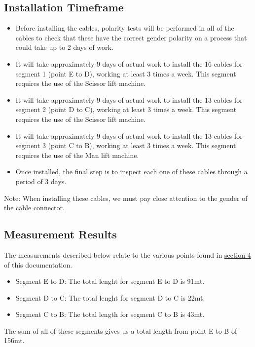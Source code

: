 \newpage

  \subsection{Installation Timeframe}
  \begin{itemize}
    \item Before installing the cables, polarity tests will be performed in all of the cables to check that these have the correct gender polarity on a process that could take up to 2 days of work.  
  
    \item It will take approximately 9 days of actual work to install the 16 cables for segment 1 (point E to D), working at least 3 times a week. This segment requires the use of the Scissor lift machine. 
  
    \item It will take approximately 9 days of actual work to install the 13 cables for segment 2 (point D to C), working at least 3 times a week. This segment requires the use of the Scissor lift machine.
  
    \item It will take approximately 9 days of actual work to install the 13 cables for segment 3 (point C to B), working at least 3 times a week. This segment requires the use of the Man lift machine.
  
    \item Once installed, the final step is to inspect each one of these cables through a period of 3 days. 
  \end{itemize}
  Note: When installing these cables, we must pay close attention to the gender of the cable connector.

\newpage

  \subsection{Measurement Results}
  
  The measurements described below relate to the various points found in \hyperref[sec:disconnectpoints]{section 4} of this documentation.
  
  \begin{itemize}
    \item Segment E to D: The total lenght for segment E to D is 91mt.
    \item Segment D to C: The total lenght for segment D to C is 22mt.
    \item Segment C to B: The total length for segment C to B is 43mt.
  \end{itemize}
  The sum of all of these segments gives us a total length from point E to B of 156mt.
